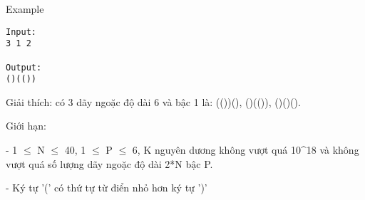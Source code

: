 Example
\begin{verbatim}
Input:
3 1 2

Output:
()(())
\end{verbatim}

   Giải thích: có 3 dãy ngoặc độ dài 6 và bậc 1 là: (())(), ()(()), ()()().   


   Giới hạn:   


   - 1  $\le$  N  $\le$  40, 1  $\le$  P  $\le$  6, K nguyên dương không vượt quá 10^18 và không vượt quá số lượng dãy ngoặc độ dài 2*N bậc P.   


   - Ký tự '(' có thứ tự từ điển nhỏ hơn ký tự ')'